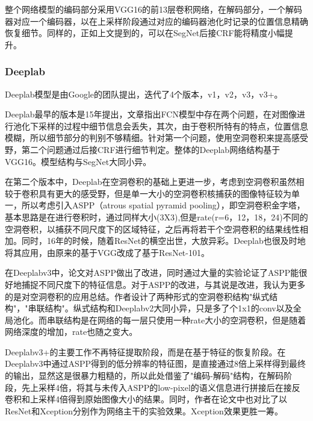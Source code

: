\documentclass{article}
\begin{document}
\begin{CJK}{UTF8}{gbsn}
整个网络模型的编码部分采用VGG16\cite{simonyan2014very}的前13层卷积网络，在解码部分，一个解码器对应一个编码器，以在上采样阶段通过对应的编码器池化时记录的位置信息精确恢复细节。同样的，正如上文提到的，可以在SegNet\cite{badrinarayanan2017segnet}后接CRF\cite{krahenbuhl2011efficient}能将精度小幅提升。

\subsubsection{Deeplab}
Deeplab\cite{chen2014semantic}模型是由Google的团队提出，迭代了4个版本，v1\cite{chen2014semantic}，v2\cite{chen2018deeplab}，v3\cite{chen2017rethinking}，v3+\cite{chen2018encoder}。

Deeplab\cite{chen2014semantic}最早的版本是15年提出，文章指出FCN\cite{long2015fully}模型中存在两个问题，在对图像进行池化下采样的过程中细节信息会丢失，其次，由于卷积所特有的特点，位置信息模糊，所以细节部分的判别不够精细。针对第一个问题，使用空洞卷积来提高感受野，第二个问题通过后接CRF\cite{krahenbuhl2011efficient}进行细节判定。整体的Deeplab\cite{chen2014semantic}网络结构基于VGG16\cite{simonyan2014very}。模型结构与SegNet\cite{badrinarayanan2017segnet}大同小异。

在第二个版本中，Deeplab\cite{chen2018deeplab}在空洞卷积的基础上更进一步，考虑到空洞卷积虽然相较于卷积具有更大的感受野，但是单一大小的空洞卷积核捕获的图像特征较为单一，所以考虑引入ASPP（atrous spatial pyramid pooling），即空洞卷积金字塔，基本思路是在进行卷积时，通过同样大小(3X3),但是rate(r=6，12，18，24)不同的空洞卷积，以捕获不同尺度下的区域特征，之后再将若干个空洞卷积的结果线性相加。同时，16年的时候，随着ResNet\cite{he2016deep}的横空出世，大放异彩。Deeplab也很及时地将其应用，由原来的基于VGG\cite{simonyan2014very}改成了基于ResNet-101\cite{he2016deep}。

在Deeplabv3\cite{chen2017rethinking}中，论文对ASPP做出了改进，同时通过大量的实验论证了ASPP能很好地捕捉不同尺度下的特征信息。对于ASPP的改进，与其说是改进，我认为更多的是对空洞卷积的应用总结。作者设计了两种形式的空洞卷积结构"纵式结构"，"串联结构"。纵式结构和Deeplabv2大同小异，只是多了个1x1的conv以及全局池化。而串联结构是在网络的每一层只使用一种rate大小的空洞卷积，但是随着网络深度的增加，rate也随之变大。

Deeplabv3+\cite{chen2018encoder}的主要工作不再特征提取阶段，而是在基于特征的恢复阶段。在Deeplabv3\cite{chen2017rethinking}中通过ASPP得到的低分辨率的特征图，是直接通过8倍上采样得到最终的输出，显然这是很暴力粗糙的，所以此处借鉴了"编码-解码"结构，在解码阶段，先上采样4倍，将其与未传入ASPP的low-pixel的语义信息进行拼接后在接反卷积和上采样4倍得到原始图像大小的结果。同时，作者在论文中也对比了以ResNet\cite{he2016deep}和Xception\cite{chollet2017xception}分别作为网络主干的实验效果。Xception\cite{chollet2017xception}效果更胜一筹。


\end{CJK}
\end{document}
